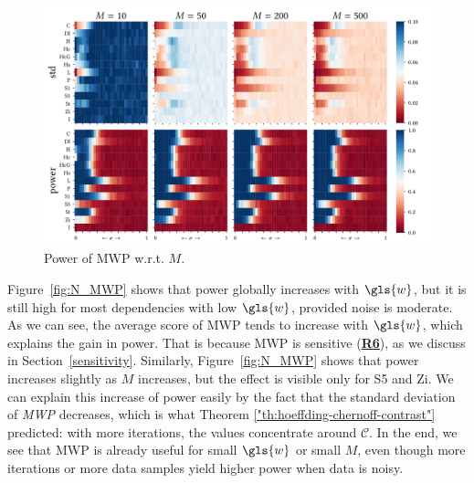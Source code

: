 \begin{figure}[ht]
	\centering
	\includegraphics[width=\linewidth, trim=0 0.5cm 0 0.5cm]{part2-figures/Fig5_2-2_thesis-compressed.pdf}
	\caption{Power of \gls{MWP} w.r.t. $M$.}
	\label{fig:M_MWP}
\end{figure}

Figure~\ref{fig:N_MWP} shows that power globally increases with $\gls{w}$, but it is still high for most dependencies with low $\gls{w}$, provided noise is moderate. 
As we can see, the average score of \gls{MWP} tends to increase with $\gls{w}$, which explains the gain in power. That is because \gls{MWP} is sensitive (\hyperlink{R6}{\textbf{R6}}), as we discuss in \mbox{Section \ref{sensitivity}}.
Similarly, Figure~\ref{fig:N_MWP} shows that power increases slightly as $M$ increases, but the effect is visible only for S5 and Zi. We can explain this increase of power easily by the fact that the standard deviation of \textit{\gls{MWP}} decreases, which is what Theorem \ref{"th:hoeffding-chernoff-contrast"} predicted: with more iterations, the values concentrate around $\mathcal{C}$. 
In the end, we see that \gls{MWP} is already useful for small $\gls{w}$ or small $M$, even though more iterations or more data samples yield higher power when data is noisy. 

